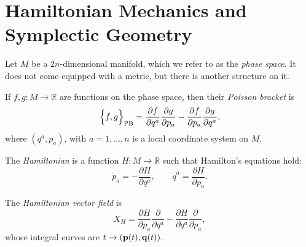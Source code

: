 \chapter{Hamiltonian Mechanics and Symplectic Geometry}%
\label{cha:hamiltonian_mechanics_and_symplectic_geometry}

Let $M$  be a $2n$-dimensional manifold, which we refer to as the \emph{phase space}.
It does not come equipped with a metric, but there is another structure on it.
\begin{definition}
  If $f, g \colon M \to \mathbb{R}$ are functions on the phase space, then their \emph{Poisson bracket} is
  \begin{equation}
    \Bigl\{ f, g \Bigr\}_{\text{PB}} = \frac{\partial f}{\partial q^a} \frac{\partial g}{\partial p_a} - \frac{\partial f}{\partial p_a} \frac{\partial g}{\partial q^a},
  \end{equation}
  where $(q^a, p_a)$, with $a = 1, \dots, n$ is a local coordinate system on $M$.
\end{definition}

\begin{definition}[Hamiltonian]
  The \emph{Hamiltonian} is a function $H\colon M \to \mathbb{R}$  such that Hamilton's equations hold:
  \begin{equation}
    \dot{p}_a = -\frac{\partial H}{\partial q^a}, \qquad \dot{q}^a = \frac{\partial H}{\partial p_a}.
  \end{equation}
\end{definition}
\begin{definition}
  The \emph{Hamiltonian vector field} is
  \begin{equation}
    X_H = \frac{\partial H}{\partial p_a} \frac{\partial }{\partial q^a} - \frac{\partial H}{\partial q^a} \frac{\partial }{\partial p_a},
  \end{equation}
  whose integral curves are $t \to (\vb{p}(t), \vb{q}(t))$.
\end{definition}

